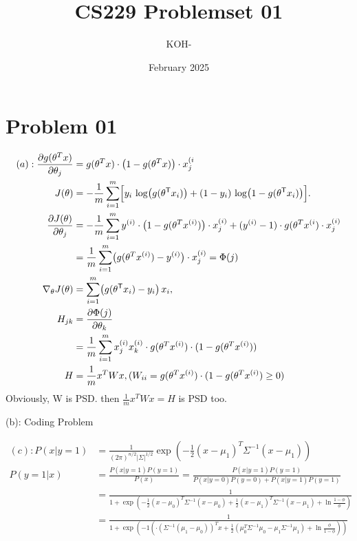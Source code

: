 \documentclass{article}
\title{CS229 Problemset 01}
\author{KOH-}
\date{February 2025}
\begin{document}
\maketitle

\section{Problem 01}

\begin{align*}
(a):
\frac{\partial g(\theta^T x)}{\partial \theta_j} &= g(\theta^T x) \cdot \bigl(1-g(\theta^T x)\bigr) \cdot x^{(i}_j\\
J(\theta)&=-\frac{1}{m}\sum_{i=1}^{m}\Bigl[y_i\,\log\bigl(g(\theta^\mathsf{T} x_i)\bigr)
+
(1 - y_i)\,\log\bigl(1 - g(\theta^\mathsf{T} x_i)\bigr)
\Bigr].\\
\frac{\partial J(\theta)}{\partial \theta_j}&=-\frac{1}{m}\sum_{i=1}^m  y^{(i)} \cdot \bigl(1-g(\theta^T x^{(i)})\bigr) \cdot x^{(i)}_j + (y^{(i)}-1)\cdot g(\theta^T x^{(i})\cdot x^{(i)}_j\\
&=\frac{1}{m} \sum_{i=1}^m \bigl(g(\theta^T x^{(i)})-y^{(i)}\bigr)\cdot x^{(i)}_j=\Phi(j)
\\
\nabla_\theta J(\theta)
&=\sum_{i=1}^{m}\bigl(g(\theta^\mathsf{T} x_i) - y_i\bigr)\,x_i,
\\
H_{jk}&=\frac{\partial \Phi(j)}{\partial \theta_k}\\
&=\frac{1}{m}\sum_{i=1}^m x_j^{(i)}x_k^{(i)}\cdot g(\theta^T x^{(i)})\cdot (1-g(\theta^Tx^{(i)}))
\\
H&=\frac{1}{m}x^TWx,(W_{ii}=g(\theta^Tx^{(i)}) \cdot (1-g(\theta^T x^{(i)})\geq 0)
\end{align*}
Obviously, W is PSD.
then $\frac{1}{m}x^TWx=H$ is PSD too.

(b): Coding Problem

\begin{align*}
(c):
P(x|y=1)&=\frac{1}{(2\pi)^{n/2} |\Sigma|^{1/2}}\exp(-\frac{1}{2}(x-\mu_1)^T\Sigma^{-1}(x-\mu_1))\\
P(y=1|x)&=\frac{P(x|y=1)P(y=1)}{P(x)}=\frac{P(x|y=1)P(y=1)}{P(x|y=0)P(y=0)+P(x|y=1)P(y=1)}\\
&=\frac{1}{1+\exp(-\frac{1}{2}(x-\mu_0)^T\Sigma^{-1}(x-\mu_0)+\frac{1}{2}(x-\mu_1)^T\Sigma^{-1}(x-\mu_1)+\ln\frac{1-\phi}{\phi})}\\
&=\frac{1}{1+\exp(-1 (\cdot(\Sigma^{-1}(\mu_1-\mu_0))^Tx+\frac{1}{2}(\mu_0^T\Sigma^{-1}\mu_0-\mu_1\Sigma^{-1}\mu_1)+\ln \frac{\phi}{1-\phi}))}
\end{align*}
\end{document}
